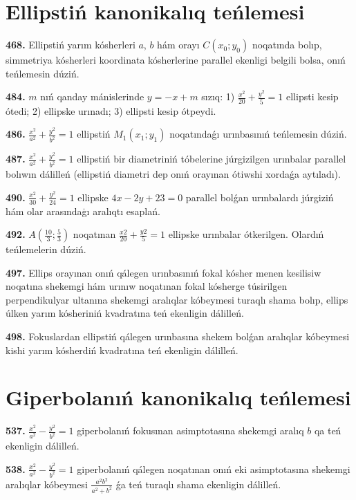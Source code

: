\section{Ellipstiń kanonikalıq teńlemesi}


\textbf{468.} Ellipstiń yarım kósherleri $a$, $b$ hám orayı $C\left(x_0; y_0\right) $ noqatında bolıp, simmetriya kósherleri koordinata kósherlerine parallel ekenligi belgili bolsa, onıń teńlemesin dúziń.

\textbf{484.} $m$ nıń qanday mánislerinde $y=-x+m$ sızıq: 1) $\frac{x^2}{20}+\frac{y^2}{5}=1$ ellipsti kesip ótedi; 2) ellipske urınadı; 3) ellipsti kesip ótpeydi.

\textbf{486.} $\frac{x^2}{a^2}+\frac{y^2}{b^2}=1$ ellipstiń $M_1 (x_1; y_1) $ noqatındaǵı urınbasınıń teńlemesin dúziń.

\textbf{487.} $\frac{x^2}{a^2}+\frac{y^2}{b^2}=1$ ellipstiń bir diametriniń tóbelerine júrgizilgen urınbalar parallel bolıwın dálilleń (ellipstiń diametri dep onıń orayınan ótiwshi xordaǵa aytıladı).

\textbf{490.} $\frac{x^2}{30}+\frac{y^2}{24}=1$ ellipske $4x-2y+23=0$ parallel bolǵan urınbalardı júrgiziń hám olar arasındaģı aralıqtı esaplań.

\textbf{492.} $A\left(\frac{10}{3}; \frac{5}{3}\right)$ noqatınan $\frac{x2}{20}+\frac{y2}{5}=1$ ellipske urınbalar ótkerilgen. Olardıń teńlemelerin dúziń.

\textbf{497.} Ellips orayınan onıń qálegen urınbasınıń fokal kósher menen kesilisiw noqatına shekemgi hám urınıw noqatınan fokal kósherge túsirilgen perpendikulyar ultanına shekemgi aralıqlar kóbeymesi turaqlı shama bolıp, ellips úlken yarım kósheriniń kvadratına teń ekenligin dálilleń.

\textbf{498.} Fokuslardan ellipstiń qálegen urınbasına shekem bolǵan aralıqlar kóbeymesi kishi yarım kósherdiń kvadratına teń ekenligin dálilleń.



\section{Giperbolanıń kanonikalıq teńlemesi}





\textbf{537.} $\frac{x^2}{a^2}-\frac{y^2}{b^2}=1$ giperbolanıń fokusınan asimptotasına shekemgi aralıq $b$ qa teń ekenligin dálilleń.

\textbf{538.} $\frac{x^2}{a^2}-\frac{y^2}{b^2}=1$ giperbolanıń qálegen noqatınan onıń eki asimptotasına shekemgi aralıqlar kóbeymesi $\frac{a^2 b^2}{a^2+b^2}$ ǵa teń turaqlı shama ekenligin dálilleń.

